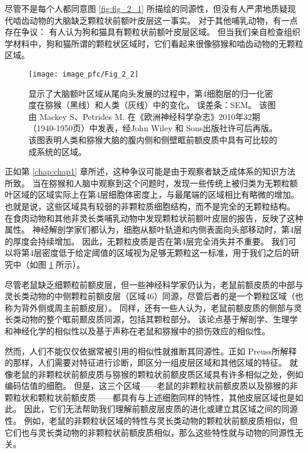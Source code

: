 尽管不是每个人都同意图 \ref{fig:fig_2_1} 所描绘的同源性，但没有人严肃地质疑现代啮齿动物的大脑缺乏颗粒状前额叶皮层这一事实。
对于其他哺乳动物，有一点存在争议：
有人认为狗\cite{rajkowska1988intrinsic}和猫\cite{je1948orbitofrontal}具有颗粒状前额叶皮层区域。
但当我们亲自检查组织学材料中，狗和猫所谓的颗粒状区域时，它们看起来很像猕猴和啮齿动物的无颗粒区域。


\begin{figure}[!htb]
	\centering
	\texttt{[image: image\_pfc/Fig\_2\_2]}
	\caption{显示了大脑额叶区域从尾向头发展的过程中，第4细胞层的归一化密度在猕猴（黑线）和人类（灰线）中的变化。
		误差条：SEM。
		该图由 Mackey S、Petrides M. 在《欧洲神经科学杂志》2010年32期（1940-1950页）中发表，经John Wiley 和 Sons出版社许可后再版。
		该图表明人类和猕猴大脑的腹内侧和侧壁眶前额皮质中具有可比较的成系统的区域。\label{fig:fig_2_2}}
\end{figure}


正如第 \ref{chap:chap1} 章所述，这种争议可能是由于观察者缺乏成体系的知识方法所致。
当在猕猴和人脑中观察到这个问题时\cite{mackey2010quantitative}，发现一些传统上被归类为无颗粒额叶区域的区域实际上在第4层细胞体密度上，与最尾端的区域相比有略微的增加。
也就是说，这些区域具有较弱的非颗粒质细胞结构，而不是完全的无颗粒结构。
在食肉动物和其他非灵长类哺乳动物中发现颗粒状前额叶皮层的报告，反映了这种属性。
神经解剖学家们都认为，细胞从额叶轨道和内侧表面向头部移动时，第4层的厚度会持续增加。
因此，无颗粒皮质是否在第4层完全消失并不重要。
我们可以将第4层密度低于给定阈值的区域视为足够无颗粒这一标准，用于我们之后的研究中（如图 \ref{fig:fig_2_2} 所示）。


尽管老鼠缺乏细颗粒前额皮层，但一些神经科学家仍认为，老鼠前额皮质的中部与灵长类动物的中侧颗粒前额皮层（区域46）同源\cite{kolb2007all}，尽管后者的是一个颗粒区域（也称为背外侧或周主前额皮层）。
同样，还有一些人认为，老鼠前额皮质的侧部与灵长类动物的整个眶前颞皮质同源，包括其颗粒部分\cite{kolb2007all,schoenbaum2009new}。
该论点基于解剖学、生理学和神经化学的相似性以及基于声称在老鼠和猕猴中的损伤效应的相似性。


然而，人们不能仅仅依据常被引用的相似性就推断其同源性。正如 Preuss\cite{preuss1995rats}所解释的那样，人们需要对特征进行诊断，即区分一组皮层区域和其他区域的特征。
就像老鼠的非颗粒状前额皮质与猕猴的颗粒状前额皮质区域具有许多相似之处，例如编码估值的细胞。
但是，这三个区域——老鼠的非颗粒状前额皮质以及猕猴的非颗粒状和颗粒状前额皮质——都具有与上述细胞同样的特性，其他皮层区域也是如此。
因此，它们无法帮助我们理解前额皮层皮质的进化或建立其区域之间的同源性。
例如，老鼠的非颗粒状区域的特性与灵长类动物的颗粒状前额皮质相似，但它们也与灵长类动物的非颗粒状前额皮质相似，那么这些特性就与动物的同源性无关。


